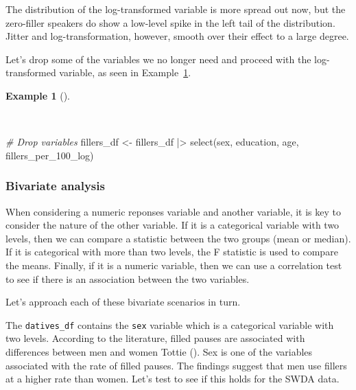 \documentclass[
  letterpaper,
  DIV=11,
  numbers=noendperiod]{scrreprt}
\newenvironment{Shaded}{\begin{snugshade}}{\end{snugshade}}
\newcommand{\CommentTok}[1]{\textcolor[rgb]{0.00,0.00,0.00}{\textit{#1}}}
\newcommand{\FunctionTok}[1]{\textcolor[rgb]{0.00,0.00,0.00}{#1}}
\newcommand{\NormalTok}[1]{\textcolor[rgb]{0.00,0.00,0.00}{#1}}
\newcommand{\OtherTok}[1]{\textcolor[rgb]{0.00,0.00,0.00}{#1}}
\newcommand{\SpecialCharTok}[1]{\textcolor[rgb]{0.00,0.00,0.00}{#1}}
\theoremstyle{definition}
\newtheorem{example}{Example}[chapter]
\theoremstyle{remark}
\begin{document}
The distribution of the log-transformed variable is more spread out now,
but the zero-filler speakers do show a low-level spike in the left tail
of the distribution. Jitter and log-transformation, however, smooth over
their effect to a large degree.

Let's drop some of the variables we no longer need and proceed with the
log-transformed variable, as seen in Example~\ref{exm-ida-num-uni-drop}.

\begin{example}[]\protect\hypertarget{exm-ida-num-uni-drop}{}\label{exm-ida-num-uni-drop}

~

\begin{Shaded}
\begin{Highlighting}[]
\CommentTok{\# Drop variables}
\NormalTok{fillers\_df }\OtherTok{\textless{}{-}}
\NormalTok{  fillers\_df }\SpecialCharTok{|\textgreater{}}
    \FunctionTok{select}\NormalTok{(sex, education, age, fillers\_per\_100\_log)}
\end{Highlighting}
\end{Shaded}

\end{example}

\subsubsection{Bivariate analysis}\label{bivariate-analysis}

When considering a numeric reponses variable and another variable, it is
key to consider the nature of the other variable. If it is a categorical
variable with two levels, then we can compare a statistic between the
two groups (mean or median). If it is categorical with more than two
levels, the F statistic is used to compare the means. Finally, if it is
a numeric variable, then we can use a correlation test to see if there
is an association between the two variables.

Let's approach each of these bivariate scenarios in turn.

The \texttt{datives\_df} contains the \texttt{sex} variable which is a
categorical variable with two levels. According to the literature,
filled pauses are associated with differences between men and women
Tottie (). Sex is one of the variables
associated with the rate of filled pauses. The findings suggest that men
use fillers at a higher rate than women. Let's test to see if this holds
for the SWDA data.
\end{document}
